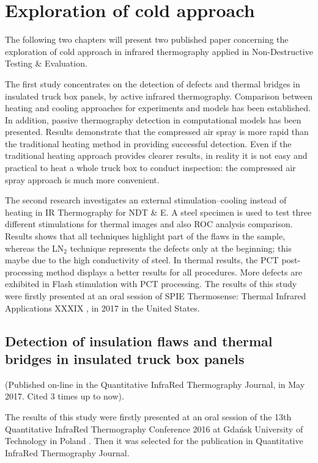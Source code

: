 \part{Exploration of cold approach}     %
The following two chapters will present two published paper concerning the exploration of cold approach in infrared thermography applied in Non-Destructive Testing \& Evaluation.

The first study concentrates on the detection of defects and thermal bridges in insulated truck box panels, by active infrared thermography. Comparison between heating and cooling approaches for experiments and models has been established. In addition, passive thermography detection in computational models has been presented. Results demonstrate that the compressed air spray is more rapid than the traditional heating method in providing successful detection. Even if the traditional heating approach provides clearer results, in reality it is not easy and practical to heat a whole truck box to conduct inspection: the compressed air spray approach is much more convenient.

The second research investigates an external stimulation–cooling instead of heating in IR Thermography for NDT \& E. A steel specimen is used to test three different stimulations for thermal images and also ROC analysis comparison. Results shows that all techniques highlight part of the flaws in the sample, whereas the LN$_2$ technique represents the defects only at the beginning; this maybe due to the high conductivity of steel. In thermal results, the PCT post-processing method displays a better results for all procedures. More defects are exhibited in Flash stimulation with PCT processing.  The results of this study were firstly presented at an oral session of SPIE Thermosense: Thermal Infrared Applications XXXIX , in 2017 in the United States.

\chapter{Detection of insulation flaws and thermal bridges in insulated truck box panels}
(Published on-line in the Quantitative InfraRed Thermography Journal, in May 2017. Cited 3 times up to now).

%
The results of this study were firstly presented at an oral session of the 13th Quantitative InfraRed Thermography Conference 2016 at Gdańsk University of Technology in Poland . Then it was selected for the publication in Quantitative InfraRed Thermography Journal.

